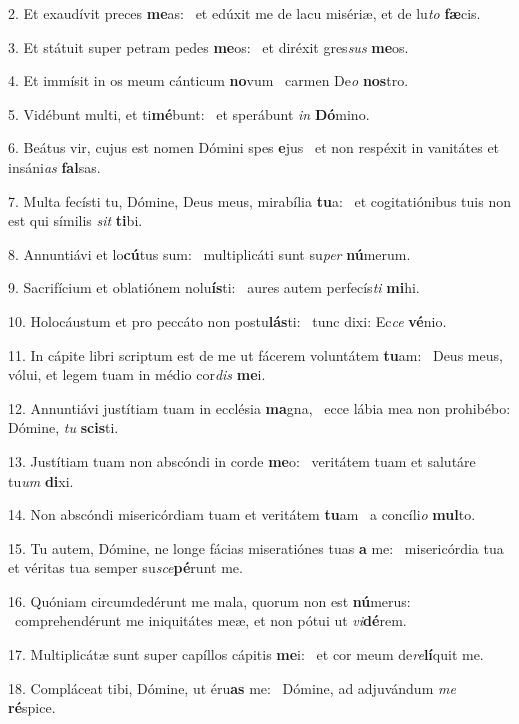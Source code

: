 2. Et exaudívit preces \textbf{me}as: \ast\  et edúxit me de lacu misériæ, et de lu\textit{to} \textbf{fæ}cis.\

3. Et státuit super petram pedes \textbf{me}os: \ast\  et diréxit gres\textit{sus} \textbf{me}os.\

4. Et immísit in os meum cánticum \textbf{no}vum \ast\  carmen De\textit{o} \textbf{nos}tro.\

5. Vidébunt multi, et ti\textbf{mé}bunt: \ast\  et sperábunt \textit{in} \textbf{Dó}mino.\

6. Beátus vir, cujus est nomen Dómini spes \textbf{e}jus \ast\  et non respéxit in vanitátes et insáni\textit{as} \textbf{fal}sas.\

7. Multa fecísti tu, Dómine, Deus meus, mirabília \textbf{tu}a: \ast\  et cogitatiónibus tuis non est qui símilis \textit{sit} \textbf{ti}bi.\

8. Annuntiávi et lo\textbf{cú}tus sum: \ast\  multiplicáti sunt su\textit{per} \textbf{nú}merum.\

9. Sacrifícium et oblatiónem nolu\textbf{ís}ti: \ast\  aures autem perfecís\textit{ti} \textbf{mi}hi.\

10. Holocáustum et pro peccáto non postu\textbf{lás}ti: \ast\  tunc dixi: Ec\textit{ce} \textbf{vé}nio.\

11. In cápite libri scriptum est de me ut fácerem voluntátem \textbf{tu}am: \ast\  Deus meus, vólui, et legem tuam in médio cor\textit{dis} \textbf{me}i.\

12. Annuntiávi justítiam tuam in ecclésia \textbf{ma}gna, \ast\  ecce lábia mea non prohibébo: Dómine, \textit{tu} \textbf{scis}ti.\

13. Justítiam tuam non abscóndi in corde \textbf{me}o: \ast\  veritátem tuam et salutáre tu\textit{um} \textbf{di}xi.\

14. Non abscóndi misericórdiam tuam et veritátem \textbf{tu}am \ast\  a concíli\textit{o} \textbf{mul}to.\

15. Tu autem, Dómine, ne longe fácias miseratiónes tuas \textbf{a} me: \ast\  misericórdia tua et véritas tua semper su\textit{sce}\textbf{pé}runt me.\

16. Quóniam circumdedérunt me mala, quorum non est \textbf{nú}merus: \ast\  comprehendérunt me iniquitátes meæ, et non pótui ut \textit{vi}\textbf{dé}rem.\

17. Multiplicátæ sunt super capíllos cápitis \textbf{me}i: \ast\  et cor meum de\textit{re}\textbf{lí}quit me.\

18. Compláceat tibi, Dómine, ut éru\textbf{as} me: \ast\  Dómine, ad adjuvándum \textit{me} \textbf{ré}spice.\

